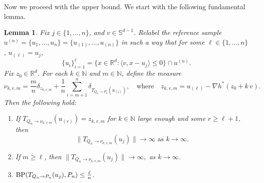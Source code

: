 \documentclass[11pt]{article}
\newcommand{\RR}{\mathbb{R}}
\newcommand{\R}{\RR}
\newcommand{\NN}{\mathbb{N}}
\theoremstyle{plain}
\newtheorem{lemma}[theorem]{Lemma}
\theoremstyle{definition}\newtheorem{definition}[theorem]{Definition}
\theoremstyle{remark}
\begin{document}
Now we proceed with the upper bound. We start with the following fundamental lemma.

%
%
\begin{lemma}\label{lemma:discrete-upper}
    Fix $j\in \{1, \dots, n\}$, and $v\in \mathbb{S}^{d-1}$.  
%
Relabel  the reference sample $u^{(n)}=\{u_1, \dots, u_{n}\}= \{ u_{(1)}, \dots, u_{(n)}\}$ in such a way that for some $\ell\in \{1, \dots, n\}$,  $u_{(\ell)}= u_j$, 
$$ \{u_i\}_{i=1}^{\ell}= \{ x\in \mathbb{R}^d: \langle v, x-u_j\rangle \leq  0\} \cap u^{(n)}. $$
Fix $z_0\in \R^d$. For each $k\in \NN$ and $m\in \NN$, 
    define the measure 
    \begin{equation}\label{eq:def-nu-zeta}
        \nu_{k,v,m}=\frac{m}{n} \delta_{ z_{k,v,m}} + \frac{1}{n} \sum_{i=m+1}^n \delta_{T_{Q_n\to P_n}(u_{(i)})} , \quad \text{where}\quad z_{k,v,m} = u_{(\ell)} - \nabla h^{*}(z_0+k\, v). 
    \end{equation} Then the following hold: 

\begin{enumerate}
    \item  If   $ T_{Q_n\to \nu_{k,v,m}}(u_{(r)})=z_{k,v,m} $ for $k\in \NN$ large enough and some $r\geq \ell+1$, then
    $$ \text{$\| T_{Q_n\to \nu_{k,v,m}}(u_{j} )\|\to \infty  $ as $k\to \infty$.}$$
     
    \item If $m\geq \ell$, then $\| T_{Q_n\to \nu_{k,v,m}}(u_{j} )\|\to \infty  ,$ as $k\to \infty$. 
    \item ${\rm BP}({ T}_{Q_n\to P_n}(u_j), P_n) \leq  \frac{\ell}{n}$.
\end{enumerate}



\end{lemma}
\end{document}
